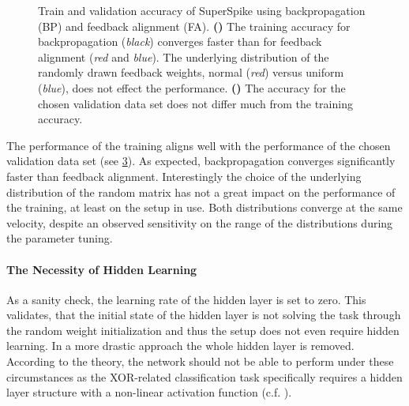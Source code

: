 \begin{figure}
	\begin{subfigure}[c]{0.5\textwidth}
		\centering
		\caption{}
		
		\label{bptrain73}
	\end{subfigure}	
	\begin{subfigure}[c]{0.5\textwidth}
		\centering
		\caption{}
		
		\label{bptest73}
	\end{subfigure}
	\caption[Train and validation accuracy of SuperSpike using backpropagation and feedback alignment.]{Train and validation accuracy of SuperSpike using backpropagation (BP) and feedback alignment (FA). \textbf{()} The training accuracy for backpropagation (\textit{black}) converges faster than for feedback alignment (\textit{red} and \textit{blue}). The underlying distribution of the randomly drawn feedback weights, normal (\textit{red}) versus uniform (\textit{blue}), does not effect the performance. \textbf{()} The accuracy for the chosen validation data set does not differ much from the training accuracy.}
	\label{BPvsFA73}
\end{figure}

The performance of the training aligns well with the performance of the chosen validation data set (see \cref{BPvsFA73}). As expected, backpropagation converges significantly faster than feedback alignment. Interestingly the choice of the underlying distribution of the random matrix has not a great impact on the performance of the training, at least on the setup in use. Both distributions converge at the same velocity, despite an observed sensitivity on the range of the distributions during the parameter tuning.

\paragraph{The Necessity of Hidden Learning}
As a sanity check, the learning rate of the hidden layer is set to zero. This validates, that the initial state of the hidden layer is not solving the task through the random weight initialization and thus the setup does not even require hidden learning. In a more drastic approach the whole hidden layer is removed. According to the theory, the network should not be able to perform under these circumstances as the XOR-related classification task specifically requires a hidden layer structure with a non-linear activation function (c.f. \citealp{Goodfellow-et-al-2016}).

